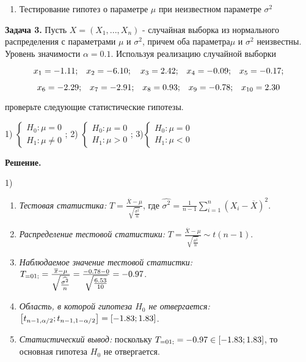 \begin{enumerate}
\item  Тестирование гипотез о параметре $\mu $ при неизвестном параметре \textbf{$\sigma ^{2} $}
\end{enumerate}



\textbf{Задача 3.} Пусть $X=\left(X_{1} ,...,X_{n} \right)$ - случайная выборка из нормального распределения с параметрами $\mu $ и $\sigma ^{2} $, причем оба параметра$\mu $ и $\sigma ^{2} $ неизвестны. Уровень значимости $\alpha =0.1$. Используя реализацию случайной выборки 

\[x_{1} =-{\rm 1.11;}\quad x_{2} =-{\rm 6.1}0;\quad x_{3} ={\rm 2.42;}\quad x_{4} =-0.0{\rm 9;}\quad x_{5} =-0.{\rm 17;}\] 

\[x_{6} =-{\rm 2.29;}\quad x_{7} =-{\rm 2.91;}\quad x_{8} =0.{\rm 93;}\quad x_{9} =-0.{\rm 78;}\quad x_{10} ={\rm 2.3}0\] 

проверьте следующие статистические гипотезы.

1) $\left\{\begin{array}{l} {H_{0} :\mu =0} \\ {H_{1} :\mu \ne 0} \end{array}\right. $;             2) $\left\{\begin{array}{l} {H_{0} :\mu =0} \\ {H_{1} :\mu >0} \end{array}\right. $;             3)$\left\{\begin{array}{l} {H_{0} :\mu =0} \\ {H_{1} :\mu <0} \end{array}\right. $

\textbf{Решение.}

1) 

\begin{enumerate}
\item  \textit{Тестовая статистика:} $T=\frac{\overline{X}-\mu }{\sqrt{{\tfrac{\widehat{\sigma ^{2} }}{n}} } } $, где $\widehat{\sigma ^{2} }=\frac{1}{n-1} \sum _{i=1}^{n}\left(X_{i} -\overline{X}\right)^{2}  $.

\item  \textit{Распределение тестовой статистики:} $T=\frac{\overline{X}-\mu }{\sqrt{{\tfrac{\widehat{\sigma ^{2} }}{n}} } } \sim t\left(n-1\right)$.

\item  \textit{Наблюдаемое значение тестовой статистки:} $T_{=01;} =\frac{\overline{x}-\mu }{\sqrt{{\tfrac{\widehat{\sigma ^{2} }}{n}} } } =\frac{-0.78-0}{\sqrt{{\tfrac{{\rm 6.53}}{10}} } } =-{\rm 0.97}$.

\item  \textit{Область, в которой гипотеза $H_{0} $ не отвергается:} $\left[t_{n-1,\alpha /2} ;t_{n-1,1-\alpha /2} \right]=\left[-{\rm 1.83};{\rm 1.83}\right]$.

\item  \textit{Статистический вывод:} поскольку $T_{=01;} =-{\rm 0.97}\in \left[-{\rm 1.83};{\rm 1.83}\right]$, то основная гипотеза $H_{0} $ не отвергается.
\end{enumerate}





